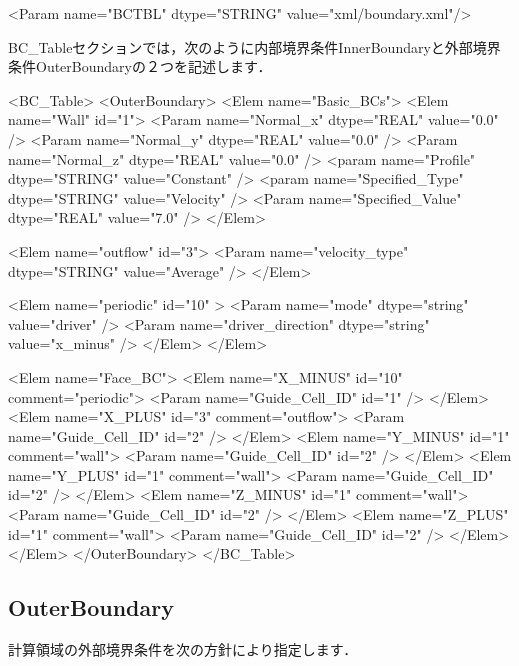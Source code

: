 {\small
\begin{program}
<Param name="BCTBL" dtype="STRING" value="xml/boundary.xml"/>
\end{program}
}

BC\_Tableセクションでは，次のように内部境界条件InnerBoundaryと外部境界条件OuterBoundaryの２つを記述します．

{\small
\begin{program}
<BC_Table>
  <OuterBoundary>
    <Elem name="Basic_BCs">
      <Elem name="Wall" id="1">
        <Param name="Normal_x"         dtype="REAL"   value="0.0" />
        <Param name="Normal_y"         dtype="REAL"   value="0.0" />
        <Param name="Normal_z"         dtype="REAL"   value="0.0" />
        <param name="Profile"          dtype="STRING" value="Constant" />
        <param name="Specified_Type"   dtype="STRING" value="Velocity" />
        <Param name="Specified_Value"  dtype="REAL"   value="7.0" />
      </Elem>
      
      <Elem name="outflow" id="3">
        <Param name="velocity_type"  dtype="STRING" value="Average" />
      </Elem>
      
      <Elem name="periodic" id="10" >
        <Param name="mode"             dtype="string" value="driver" />
        <Param name="driver_direction" dtype="string" value="x_minus" />
      </Elem>
    </Elem>
    
    <Elem name="Face_BC">
      <Elem name="X_MINUS" id="10" comment="periodic">
        <Param name="Guide_Cell_ID" id="1" />
      </Elem>
      <Elem name="X_PLUS"  id="3" comment="outflow">
        <Param name="Guide_Cell_ID" id="2" />
      </Elem>
      <Elem name="Y_MINUS" id="1" comment="wall">
        <Param name="Guide_Cell_ID" id="2" />
      </Elem>
      <Elem name="Y_PLUS"  id="1" comment="wall">
        <Param name="Guide_Cell_ID" id="2" />
      </Elem>
      <Elem name="Z_MINUS" id="1" comment="wall">
        <Param name="Guide_Cell_ID" id="2" />
      </Elem>
      <Elem name="Z_PLUS"  id="1" comment="wall">
        <Param name="Guide_Cell_ID" id="2" />
      </Elem>
    </Elem>
  </OuterBoundary>
</BC_Table>
\end{program}
}


%
\hypertarget{tgt:outer_boundary}{\subsection{OuterBoundary}}

計算領域の外部境界条件を次の方針により指定します．

